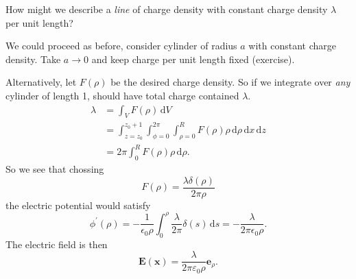 \begin{example}
    How might we describe a \textit{line} of charge density with constant charge density $ \lambda $ per unit length?

    We could proceed as before, consider cylinder of radius $a$ with constant charge density. Take $a\to 0$ and keep charge per unit length fixed (exercise).

    Alternatively, let $ F(\rho) $ be the desired charge density. So if we integrate over \textit{any} cylinder of length 1, should have total charge contained $ \lambda $.
    \begin{align*}
        \lambda&= \int_{V} F(\rho) \,\mathrm{d}V\\ 
        &= \int_{z=z_0}^{z_0+1} \int_{\phi=0}^{2\pi} \int_{\rho=0}^{R} F(\rho)\rho \,\mathrm{d}\rho \,\mathrm{d}x \,\mathrm{d}z\\ 
        &= 2\pi \int_{0}^{R} F(\rho)\rho \,\mathrm{d}\rho .
    \end{align*}
    So we see that chossing 
    \[
        F(\rho)=\frac{\lambda \delta(\rho)}{2\pi \rho}
    \]
    the electric potential would satisfy
    \[
        \phi^{\prime}(\rho)=-\frac{1}{\epsilon_{0} \rho} \int_{0}^{\rho} \frac{\lambda}{2 \pi} \delta(s) \,\mathrm{d} s=-\frac{\lambda}{2 \pi \epsilon_{0} \rho}.
    \]
    The electric field is then
    \[
        \mathbf{E}(\mathbf{x})=\frac{\lambda}{2 \pi \varepsilon_{0} \rho} \mathbf{e}_{\rho}.
    \]
\end{example}